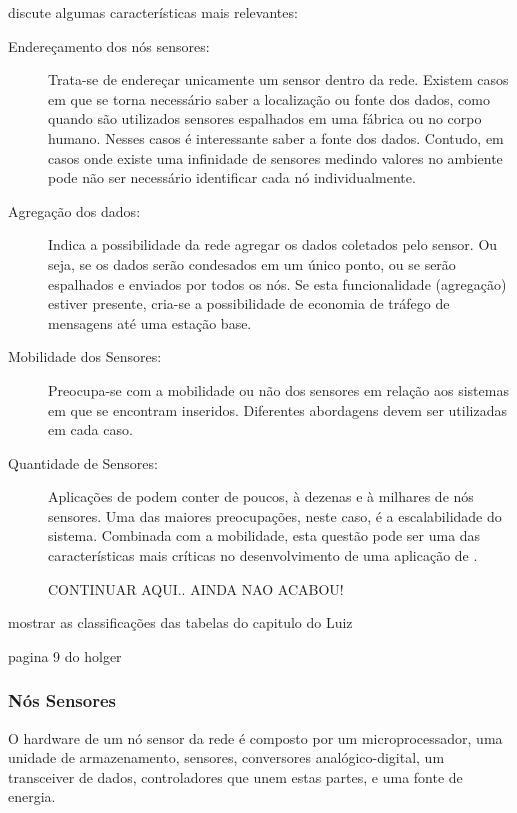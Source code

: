 \cite{Loureiro} discute algumas características mais relevantes:

\begin{description}
	\item[Endereçamento dos nós sensores:] Trata-se de endereçar unicamente um sensor dentro da rede. Existem casos em que se torna necessário saber a localização ou fonte dos dados, como quando são utilizados sensores espalhados em uma fábrica ou no corpo humano. Nesses casos é interessante saber a fonte dos dados. Contudo, em casos onde existe uma infinidade de sensores medindo valores no ambiente pode não ser necessário identificar cada nó individualmente.

	\item[Agregação dos dados:] Indica a possibilidade da rede agregar os dados coletados pelo sensor. Ou seja, se os dados serão condesados em um único ponto, ou se serão espalhados e enviados por todos os nós. Se esta funcionalidade (agregação) estiver presente, cria-se a possibilidade de economia de tráfego de mensagens até uma estação base.

	\item[Mobilidade dos Sensores: ] Preocupa-se com a mobilidade ou não dos sensores em relação aos sistemas em que se encontram inseridos. Diferentes abordagens devem ser utilizadas em cada caso. 

	\item[Quantidade de Sensores:] Aplicações de \rssf podem conter de poucos, à dezenas e à milhares de nós sensores. Uma das maiores preocupações, neste caso, é a escalabilidade do sistema. Combinada com a mobilidade, esta questão pode ser uma das características mais críticas no desenvolvimento de uma aplicação de \rssf.

	CONTINUAR AQUI.. AINDA NAO ACABOU!

\end{description}


mostrar as classificações das tabelas do capitulo do Luiz

pagina 9 do holger

\subsubsection{Nós Sensores}

O hardware de um nó sensor da rede é composto por um microprocessador, uma unidade de armazenamento, sensores, conversores analógico-digital, um transceiver de dados, controladores que unem estas partes, e uma fonte de energia. \cite{Culler2004}

